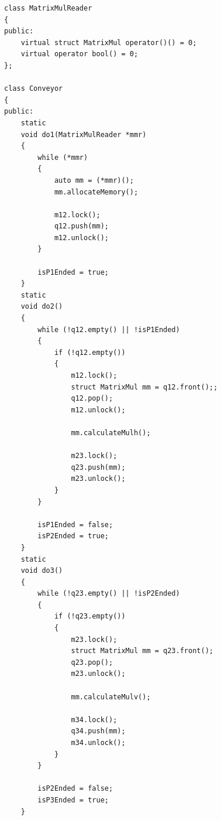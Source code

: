 \begin{lstlisting}[caption={Конвейер перемножения матриц по алгоритму Винограда, ч. 1}, label=lst:c1]
class MatrixMulReader
{
public:
    virtual struct MatrixMul operator()() = 0;
    virtual operator bool() = 0;
};

class Conveyor
{
public:
    static
    void do1(MatrixMulReader *mmr)
    {
        while (*mmr)
        {
            auto mm = (*mmr)();
            mm.allocateMemory();

            m12.lock();
            q12.push(mm);
            m12.unlock();
        }

        isP1Ended = true;
    }
    static
    void do2()
    {
        while (!q12.empty() || !isP1Ended)
        {
            if (!q12.empty())
            {
                m12.lock();
                struct MatrixMul mm = q12.front();;
                q12.pop();
                m12.unlock();

                mm.calculateMulh();

                m23.lock();
                q23.push(mm);
                m23.unlock();
            }
        }

        isP1Ended = false;
        isP2Ended = true;
    }
    static
    void do3()
    {
        while (!q23.empty() || !isP2Ended)
        {
            if (!q23.empty())
            {
                m23.lock();
                struct MatrixMul mm = q23.front();
                q23.pop();
                m23.unlock();

                mm.calculateMulv();

                m34.lock();
                q34.push(mm);
                m34.unlock();
            }
        }

        isP2Ended = false;
        isP3Ended = true;
    }
\end{lstlisting}


